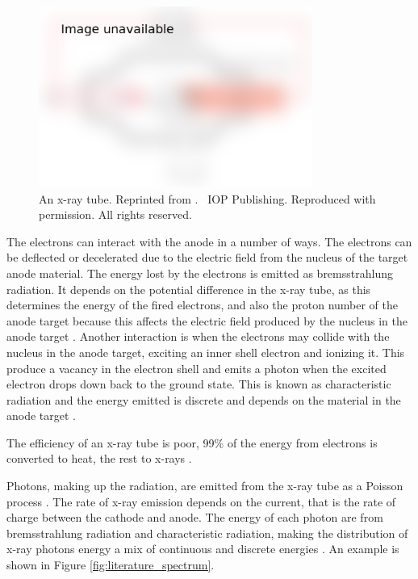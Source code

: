 \begin{figure}
  \centering
  \includegraphics[width=0.8\textwidth]{../figures/literatureReview/literature_tube.png}
  \caption{An x-ray tube. Reprinted from \cite{michael2001x}. \textcopyright\ IOP Publishing. Reproduced with permission. All rights reserved.}
  \label{fig:literature_tube}
\end{figure}

The electrons can interact with the anode in a number of ways. The electrons can be deflected or decelerated due to the electric field from the nucleus of the target anode material. The energy lost by the electrons is emitted as bremsstrahlung radiation. It depends on the potential difference in the x-ray tube, as this determines the energy of the fired electrons, and also the proton number of the anode target because this affects the electric field produced by the nucleus in the anode target \citep{sun2012overview}. Another interaction is when the electrons may collide with the nucleus in the anode target, exciting an inner shell electron and ionizing it. This produce a vacancy in the electron shell and emits a photon when the excited electron drops down back to the ground state. This is known as characteristic radiation and the energy emitted is discrete and depends on the material in the anode target \citep{sun2012overview}.

The efficiency of an x-ray tube is poor, 99\% of the energy from electrons is converted to heat, the rest to x-rays \citep{kruth2011computed}.

Photons, making up the radiation, are emitted from the x-ray tube as a Poisson process \citep{whiting2006properties, cierniak2011x}. The rate of x-ray emission depends on the current, that is the rate of charge between the cathode and anode. The energy of each photon are from bremsstrahlung radiation and characteristic radiation, making the distribution of x-ray photons energy a mix of continuous and discrete energies \citep{sun2012overview}. An example is shown in Figure \ref{fig:literature_spectrum}.

